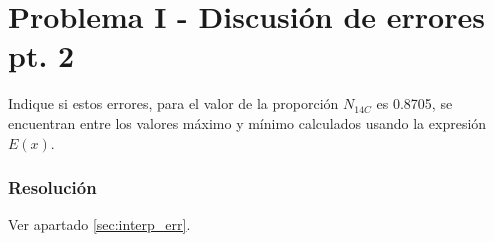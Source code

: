 \section{Problema I - Discusión de errores pt. 2} 

Indique si estos errores, para el valor de la proporción $N_{14C}$ es 0.8705, se encuentran entre los valores máximo y mínimo calculados usando la expresión $E(x)$.

\subsubsection{Resolución}

Ver apartado \ref{sec:interp_err}.